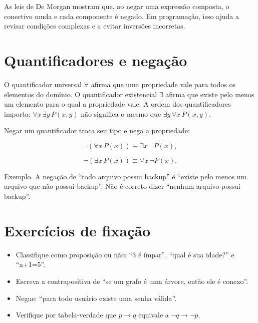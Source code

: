 \documentclass[12pt,a4paper,openany]{book}
\begin{document}
As leis de De Morgan mostram que, ao negar uma expressão composta, o conectivo muda e cada componente é negado. Em programação, isso ajuda a revisar condições complexas e a evitar inversões incorretas.



\section{Quantificadores e negação}



O quantificador universal $\forall$ afirma que uma propriedade vale para todos os elementos do domínio. O quantificador existencial $\exists$ afirma que existe pelo menos um elemento para o qual a propriedade vale. A ordem dos quantificadores importa: $\forall x\,\exists y\,P(x,y)$ não significa o mesmo que $\exists y\,\forall x\,P(x,y)$.



Negar um quantificador troca seu tipo e nega a propriedade:



\[\neg(\forall x\,P(x))\equiv\exists x\,\neg P(x),\]



\[\neg(\exists x\,P(x))\equiv\forall x\,\neg P(x).\]



\begin{exemplo}{Exemplo.}
A negação de “todo arquivo possui backup” é “existe pelo menos um arquivo que não possui backup”. Não é correto dizer “nenhum arquivo possui backup”.
\end{exemplo}



\section{Exercícios de fixação}



\begin{itemize}
\item Classifique como proposição ou não: “3 é ímpar”, “qual é sua idade?” e “x+1=5”.
\item Escreva a contrapositiva de “se um grafo é uma árvore, então ele é conexo”.
\item Negue: “para todo usuário existe uma senha válida”.
\item Verifique por tabela-verdade que $p\to q$ equivale a $\neg q\to\neg p$.
\end{itemize}
\end{document}
